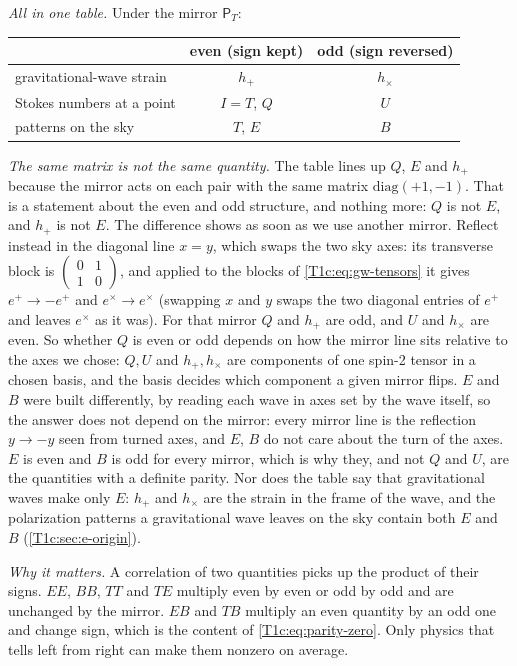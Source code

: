\emph{All in one table.} Under the mirror $\mathsf P_T$:
\begin{center}
\small
\begin{tabular}{@{}lcc@{}}
\toprule
 & even (sign kept) & odd (sign reversed)\\\midrule
gravitational-wave strain & $h_+$ & $h_\times$\\
Stokes numbers at a point & $I=T$, $Q$ & $U$\\
patterns on the sky & $T$, $E$ & $B$\\
\bottomrule
\end{tabular}
\end{center}

\emph{The same matrix is not the same quantity.} The table lines up $Q$, $E$ and $h_+$ because the mirror acts on each pair with the same matrix $\mathrm{diag}(+1,-1)$. That is a statement about the even and odd structure, and nothing more: $Q$ is not $E$, and $h_+$ is not $E$. The difference shows as soon as we use another mirror. Reflect instead in the diagonal line $x=y$, which swaps the two sky axes: its transverse block is $\begin{pmatrix}0&1\\1&0\end{pmatrix}$, and applied to the blocks of \eqref{T1c:eq:gw-tensors} it gives $e^+\to-e^+$ and $e^\times\to e^\times$ (swapping $x$ and $y$ swaps the two diagonal entries of $e^+$ and leaves $e^\times$ as it was). For that mirror $Q$ and $h_+$ are odd, and $U$ and $h_\times$ are even. So whether $Q$ is even or odd depends on how the mirror line sits relative to the axes we chose: $Q,U$ and $h_+,h_\times$ are components of one spin-2 tensor in a chosen basis, and the basis decides which component a given mirror flips. $E$ and $B$ were built differently, by reading each wave in axes set by the wave itself, so the answer does not depend on the mirror: every mirror line is the reflection $y\to-y$ seen from turned axes, and $E$, $B$ do not care about the turn of the axes. $E$ is even and $B$ is odd for every mirror, which is why they, and not $Q$ and $U$, are the quantities with a definite parity. Nor does the table say that gravitational waves make only $E$: $h_+$ and $h_\times$ are the strain in the frame of the wave, and the polarization patterns a gravitational wave leaves on the sky contain both $E$ and $B$ (\cref{T1c:sec:e-origin}).

\emph{Why it matters.} A correlation of two quantities picks up the product of their signs. $EE$, $BB$, $TT$ and $TE$ multiply even by even or odd by odd and are unchanged by the mirror. $EB$ and $TB$ multiply an even quantity by an odd one and change sign, which is the content of \eqref{T1c:eq:parity-zero}. Only physics that tells left from right can make them nonzero on average.

